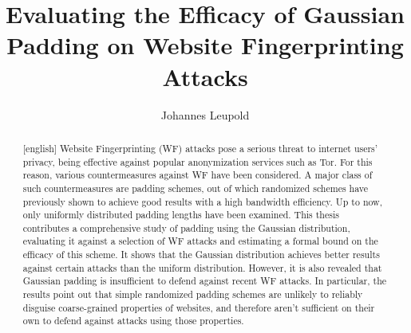 \documentclass[
	ruledheaders=chapter,
	class=report,
	thesis={type=master, department=inf},
	accentcolor=1c,
	custommargins=true,
	marginpar=false,
	parskip=half-,
	fontsize=11pt,
]{tudapub}
\begin{document}
	
	\title{Evaluating the Efficacy of Gaussian Padding on Website Fingerprinting Attacks}
	\author[J. Leupold]{Johannes Leupold}

	
	
	
	
	\maketitle
	
	\affidavit[digital]%

	\begin{abstract}[english]
		Website Fingerprinting (WF) attacks pose a serious threat to internet users' privacy, being effective against popular anonymization services such as Tor. For this reason, various countermeasures against WF have been considered. A major class of such countermeasures are padding schemes, out of which randomized schemes have previously shown to achieve good results with a high bandwidth efficiency. Up to now, only uniformly distributed padding lengths have been examined. This thesis contributes a comprehensive study of padding using the Gaussian distribution, evaluating it against a selection of WF attacks and estimating a formal bound on the efficacy of this scheme. It shows that the Gaussian distribution achieves better results against certain attacks than the uniform distribution. However, it is also revealed that Gaussian padding is insufficient to defend against recent WF attacks. In particular, the results point out that simple randomized padding schemes are unlikely to reliably disguise coarse-grained properties of websites, and therefore aren't sufficient on their own to defend against attacks using those properties.
	\end{abstract}
	
\end{document}
